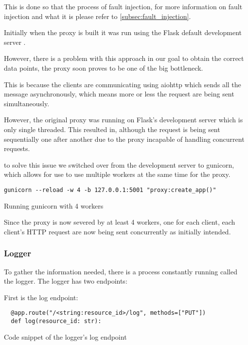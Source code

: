 This is done so that the process of fault injection, for more information on fault injection and what it is
please refer to \ref{subsec:fault_injection}.

Initially when the proxy is built it was run using the Flask default development 
server \cite{flask_dev_server}. 

However, there is a problem with this approach in our goal to obtain the correct 
data points, the proxy soon proves to be one of the big bottleneck.

This is because the clients are communicating using aiohttp which sends all the 
message asynchronously, which means more or less the request are being sent 
simultaneously.

However, the original proxy was running on Flask's development server which is 
only single threaded. This resulted in, although the request is being sent sequentially
one after another due to the proxy incapable of handling concurrent requests.

to solve this issue we switched over from the development server to gunicorn,
which allows for use to use multiple workers at the same time for the proxy.

\begin{listing}[!ht]
  \begin{verbatim}
gunicorn --reload -w 4 -b 127.0.0.1:5001 "proxy:create_app()"
  \end{verbatim}
  \caption{Running gunicorn with 4 workers}
\end{listing}

Since the proxy is now severed by at least 4 workers, one for each client, each
client's HTTP request are now being sent concurrently as initially intended.

\subsubsection{Logger}

To gather the information needed, there is a process constantly running called 
the logger. The logger has two endpoints:

First is the log endpoint: 

\begin{listing}[!ht]
  \begin{verbatim}
  @app.route("/<string:resource_id>/log", methods=["PUT"])
  def log(resource_id: str):
  \end{verbatim}
  \caption{Code snippet of the logger's log endpoint}
  \label{code:logger_log}
\end{listing}

